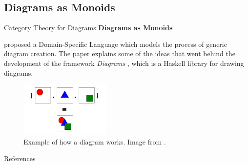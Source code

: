 \documentclass[aspectratio=169,xcolor=dvipsnames,9pt]{beamer}
\begin{document}
\subsection[Diagrams]{Diagrams as Monoids}
\begin{frame}[fragile]{Category Theory for Diagrams}
	\textbf{Diagrams as Monoids}
	\vspace{3mm}

	\citet{yorgey2012monoids} proposed a Domain-Specific Language which models
	the process of generic diagram creation.
	The paper explains some of the ideas that went behind the development
	of the framework \textit{Diagrams} \citep{yates2015diagrams},
	which is a Haskell library for drawing diagrams.
	\begin{figure}[H]
		\begin{center}
			\includegraphics[width=0.40\textwidth]{./figures/diagrams.png}
		\end{center}
		\caption{Example of how a diagram works. Image from \citet{yorgey2012monoids}.}
		\label{fig:diagrams}
	\end{figure}
\end{frame}

\begin{frame}[allowframebreaks]{References}
	\renewcommand{\section}[2]{}%
	\tiny{}
	
\end{frame}
\end{document}
